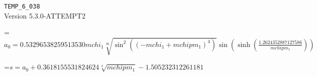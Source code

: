 \documentclass{article}
\newcommand{\exprline}[1]{\par\noindent\begingroup\setbox0=\hbox{$\displaystyle #1$}\ifdim\wd0>\linewidth\resizebox{\linewidth}{!}{\box0}\else\box0\fi\endgroup\par\medskip}
\begin{document}
\noindent\texttt{TEMP\_6\_038}\\
Version 5.3.0-ATTEMPT2\\
\exprline{a_{0} = 0.53296538259513530 mchi_{1} \sqrt[16]{\sin^{2}{\left(\left(- mchi_{1} + mchipm_{1}\right)^{4} \right)}} \sin{\left(\sinh{\left(\frac{1.2624352887127586}{mchipm_{1}} \right)} \right)}}
\exprline{s = a_{0} + 0.3618155531824624 \sqrt[4]{mchipm_{1}} - 1.505232312261181}
\end{document}
